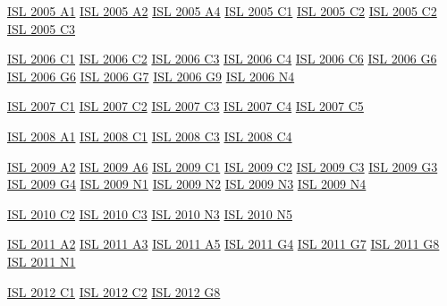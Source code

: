 \hyperref  [problem:ISL 2005 A1]{ISL 2005 A1}
\hyperref  [problem:ISL 2005 A2]{ISL 2005 A2}
\hyperref  [problem:ISL 2005 A4]{ISL 2005 A4}
\hyperref  [problem:ISL 2005 C1]{ISL 2005 C1}
\hyperref  [problem:ISL 2005 C2]{ISL 2005 C2}
\hyperref  [problem:ISL 2005 C2]{ISL 2005 C2}
\hyperref  [problem:ISL 2005 C3]{ISL 2005 C3}

\hyperref  [problem:ISL 2006 C1]{ISL 2006 C1}
\hyperref  [problem:ISL 2006 C2]{ISL 2006 C2}
\hyperref  [problem:ISL 2006 C3]{ISL 2006 C3}
\hyperref  [problem:ISL 2006 C4]{ISL 2006 C4}
\hyperref  [problem:ISL 2006 C6]{ISL 2006 C6}
\hyperref  [problem:ISL 2006 G6]{ISL 2006 G6}
\hyperref  [problem:ISL 2006 G6]{ISL 2006 G6}
\hyperref  [problem:ISL 2006 G7]{ISL 2006 G7}
\hyperref  [problem:ISL 2006 G9]{ISL 2006 G9}
\hyperref  [problem:ISL 2006 N4]{ISL 2006 N4}

\hyperref  [problem:ISL 2007 C1]{ISL 2007 C1}
\hyperref  [problem:ISL 2007 C2]{ISL 2007 C2}
\hyperref  [problem:ISL 2007 C3]{ISL 2007 C3}
\hyperref  [problem:ISL 2007 C4]{ISL 2007 C4}
\hyperref  [problem:ISL 2007 C5]{ISL 2007 C5}

\hyperref  [problem:ISL 2008 A1]{ISL 2008 A1}
\hyperref  [problem:ISL 2008 C1]{ISL 2008 C1}
\hyperref  [problem:ISL 2008 C3]{ISL 2008 C3}
\hyperref  [problem:ISL 2008 C4]{ISL 2008 C4}

\hyperref  [problem:ISL 2009 A2]{ISL 2009 A2}
\hyperref  [problem:ISL 2009 A6]{ISL 2009 A6}
\hyperref  [problem:ISL 2009 C1]{ISL 2009 C1}
\hyperref  [problem:ISL 2009 C2]{ISL 2009 C2}
\hyperref  [problem:ISL 2009 C3]{ISL 2009 C3}
\hyperref  [problem:ISL 2009 G3]{ISL 2009 G3}
\hyperref  [problem:ISL 2009 G4]{ISL 2009 G4}
\hyperref  [problem:ISL 2009 N1]{ISL 2009 N1}
\hyperref  [problem:ISL 2009 N2]{ISL 2009 N2}
\hyperref  [problem:ISL 2009 N3]{ISL 2009 N3}
\hyperref  [problem:ISL 2009 N4]{ISL 2009 N4}

\hyperref  [problem:ISL 2010 C2]{ISL 2010 C2}
\hyperref  [problem:ISL 2010 C3]{ISL 2010 C3}
\hyperref  [problem:ISL 2010 N3]{ISL 2010 N3}
\hyperref  [problem:ISL 2010 N5]{ISL 2010 N5}

\hyperref  [problem:ISL 2011 A2]{ISL 2011 A2}
\hyperref  [problem:ISL 2011 A3]{ISL 2011 A3}
\hyperref  [problem:ISL 2011 A5]{ISL 2011 A5}
\hyperref  [problem:ISL 2011 G4]{ISL 2011 G4}
\hyperref  [problem:ISL 2011 G7]{ISL 2011 G7}
\hyperref  [problem:ISL 2011 G8]{ISL 2011 G8}
\hyperref  [problem:ISL 2011 N1]{ISL 2011 N1}

\hyperref  [problem:ISL 2012 C1]{ISL 2012 C1}
\hyperref  [problem:ISL 2012 C2]{ISL 2012 C2}
\hyperref  [problem:ISL 2012 G8]{ISL 2012 G8}

